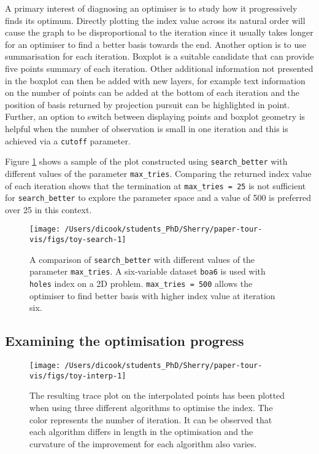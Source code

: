 \documentclass[12pt]{article}
\begin{document}
A primary interest of diagnosing an optimiser is to study how it progressively finds its optimum. Directly plotting the index value across its natural order will cause the graph to be disproportional to the iteration since it usually takes longer for an optimiser to find a better basis towards the end. Another option is to use summarisation for each iteration. Boxplot is a suitable candidate that can provide five points summary of each iteration. Other additional information not presented in the boxplot can then be added with new layers, for example text information on the number of points can be added at the bottom of each iteration and the position of basis returned by projection pursuit can be highlighted in point. Further, an option to switch between displaying points and boxplot geometry is helpful when the number of observation is small in one iteration and this is achieved via a \texttt{cutoff} parameter.

Figure \ref{fig:toy-search} shows a sample of the plot constructed using \texttt{search\_better} with different values of the parameter \texttt{max\_tries}. Comparing the returned index value of each iteration shows that the termination at \texttt{max\_tries\ =\ 25} is not sufficient for \texttt{search\_better} to explore the parameter space and a value of 500 is preferred over 25 in this context.

\begin{figure}

{\centering \texttt{[image: /Users/dicook/students\_PhD/Sherry/paper-tour-vis/figs/toy-search-1]} 

}

\caption{A comparison of \texttt{search\_better} with different values of the parameter \texttt{max\_tries}. A six-variable dataset \texttt{boa6} is used with \texttt{holes} index on a 2D problem. \texttt{max\_tries\ =\ 500} allows the optimiser to find better basis with higher index value at iteration six.}\label{fig:toy-search}
\end{figure}



\hypertarget{toy-interp}{%
\subsection{Examining the optimisation progress}\label{toy-interp}}

\begin{figure}

{\centering \texttt{[image: /Users/dicook/students\_PhD/Sherry/paper-tour-vis/figs/toy-interp-1]} 

}

\caption{The resulting trace plot on the interpolated points has been plotted when using three different algorithms to optimise the index. The color represents the number of iteration. It can be observed that each algorithm differs in length in the optimisation and the curvature of the improvement for each algorithm also varies.}\label{fig:toy-interp}
\end{figure}
\end{document}
